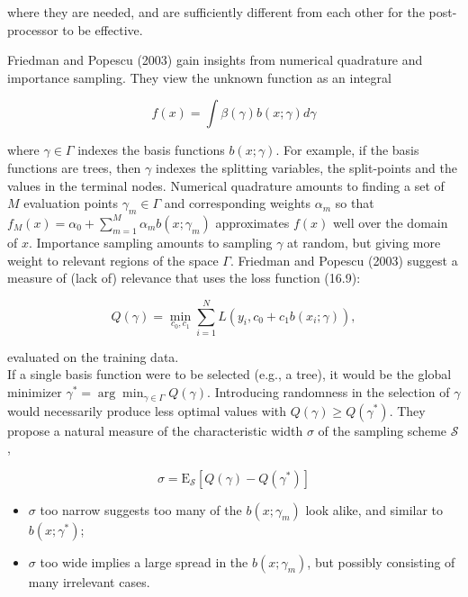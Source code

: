\documentclass[10pt]{article}
\begin{document}
where they are needed, and are sufficiently different from each other for the post-processor to be effective.

Friedman and Popescu (2003) gain insights from numerical quadrature and importance sampling. They view the unknown function as an integral


\begin{equation*}
f(x)=\int \beta(\gamma) b(x ; \gamma) d \gamma \tag{16.10}
\end{equation*}


where $\gamma \in \Gamma$ indexes the basis functions $b(x ; \gamma)$. For example, if the basis functions are trees, then $\gamma$ indexes the splitting variables, the split-points and the values in the terminal nodes. Numerical quadrature amounts to finding a set of $M$ evaluation points $\gamma_{m} \in \Gamma$ and corresponding weights $\alpha_{m}$ so that $f_{M}(x)=\alpha_{0}+\sum_{m=1}^{M} \alpha_{m} b\left(x ; \gamma_{m}\right)$ approximates $f(x)$ well over the domain of $x$. Importance sampling amounts to sampling $\gamma$ at random, but giving more weight to relevant regions of the space $\Gamma$. Friedman and Popescu (2003) suggest a measure of (lack of) relevance that uses the loss function (16.9):


\begin{equation*}
Q(\gamma)=\min _{c_{0}, c_{1}} \sum_{i=1}^{N} L\left(y_{i}, c_{0}+c_{1} b\left(x_{i} ; \gamma\right)\right), \tag{16.11}
\end{equation*}


evaluated on the training data.\\
If a single basis function were to be selected (e.g., a tree), it would be the global minimizer $\gamma^{*}=\arg \min _{\gamma \in \Gamma} Q(\gamma)$. Introducing randomness in the selection of $\gamma$ would necessarily produce less optimal values with $Q(\gamma) \geq Q\left(\gamma^{*}\right)$. They propose a natural measure of the characteristic width $\sigma$ of the sampling scheme $\mathcal{S}$,


\begin{equation*}
\sigma=\mathrm{E}_{\mathcal{S}}\left[Q(\gamma)-Q\left(\gamma^{*}\right)\right] \tag{16.12}
\end{equation*}


\begin{itemize}
  \item $\sigma$ too narrow suggests too many of the $b\left(x ; \gamma_{m}\right)$ look alike, and similar to $b\left(x ; \gamma^{*}\right)$;
  \item $\sigma$ too wide implies a large spread in the $b\left(x ; \gamma_{m}\right)$, but possibly consisting of many irrelevant cases.
\end{itemize}
\end{document}
